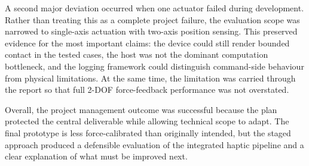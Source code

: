 A second major deviation occurred when one actuator failed during development. Rather than treating this as a complete project failure, the evaluation scope was narrowed to single-axis actuation with two-axis position sensing. This preserved evidence for the most important claims: the device could still render bounded contact in the tested cases, the host was not the dominant computation bottleneck, and the logging framework could distinguish command-side behaviour from physical limitations. At the same time, the limitation was carried through the report so that full 2-DOF force-feedback performance was not overstated.

Overall, the project management outcome was successful because the plan protected the central deliverable while allowing technical scope to adapt. The final prototype is less force-calibrated than originally intended, but the staged approach produced a defensible evaluation of the integrated haptic pipeline and a clear explanation of what must be improved next.
